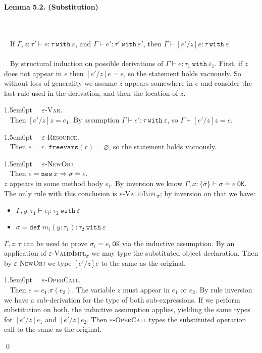 \documentclass{llncs}
\newcommand{\keywadj}[1]{\mathtt{#1}}
\newcommand{\keyw}[1]{\keywadj{#1}~}
\newcommand{\thm}[3]{
	\begin{large}
		\bf{#1}
	\end{large} \\\\
	\fbox{Statement.} ~ #2
	\fbox{Proof.}~ #3 \qed
}
\newcommand{\proofcase}[2]{
	\begin{adjustwidth}{1.5em}{0pt}
		\fbox{Case.}~~#1. \\ ~#2
	\end{adjustwidth}
}
\begin{document}
\thm{Lemma 5.2. (Substitution)}
{If $\Gamma, z : \tau' \vdash e : \tau~\keyw{with} \varepsilon$, and $\Gamma \vdash e' : \tau'~\keyw{with} \varepsilon'$, then $\Gamma \vdash [e'/z]e : \tau~\keyw{with} \varepsilon$. \\\\}
{By structural induction on possible derivations of $\Gamma \vdash e : \tau_1~\keyw{with} \varepsilon_1$. First, if $z$ does not appear in $e$ then $[e'/z]e = e$, so the statement holds vacuously. So without loss of generality we assume $z$ appears somewhere in $e$ and consider the last rule used in the derivation, and then the location of $z$. \\

	\proofcase{\textsc{$\varepsilon$-Var}} {
		Then $[e'/z]z = e_1$. By assumption $\Gamma \vdash e' : \tau~\keyw{with} \varepsilon$, so $\Gamma \vdash [e'/z]z = e$. \\
	}
		
	\proofcase{\textsc{$\varepsilon$-Resource}} {
		Then $e = r$. $\keywadj{freevars}(r) = \varnothing$, so the statement holds vacuously.\\
	}
		
	\proofcase{\textsc{$\varepsilon$-NewObj}} {
		Then $e = \keyw{new} x \Rightarrow \overline{\sigma =e}$. \\
		
		\noindent
		 $z$ appears in some method body $e_i$. By inversion we know $\Gamma, x : \{ \bar \sigma \} \vdash \overline {\sigma = e}~\keywadj{OK}$. The only rule with this conclusion is \textsc{$\varepsilon$-ValidImpl$_\sigma$}; by inversion on that we have:
		 \begin{itemize}
		 	\item $\Gamma, y : \tau_1 \vdash e_i : \tau_2~\keyw{with} \varepsilon$
		 	\item $\sigma = \keyw{def} m_i(y : \tau_1) : \tau_2~\keyw{with} \varepsilon$
		\end{itemize}
	$\Gamma, z : \tau$ can be used to prove $\sigma_i = e_i~\keywadj{OK}$ via the inductive assumption. By an application of \textsc{$\varepsilon$-ValidImpl$_\sigma$} we may type the substituted object declaration. Then by \textsc{$\varepsilon$-NewObj} we type $[e'/z]e$ to the same as the original.\\
	}
	
	\proofcase{\textsc{$\varepsilon$-OperCall}} {
		Then $e = e_1.\pi(e_2)$. The variable $z$ must appear in $e_1$ or $e_2$. By rule inversion we have a sub-derivation for the type of both sub-expressions. If we perform substitution on both, the inductive assumption applies, yielding the same types for $[e'/z]e_1$ and $[e'/z]e_2$. Then \textsc{$\varepsilon$-OperCall} types the substituted operation call to the same as the original. \\
	}

}
\end{document}
